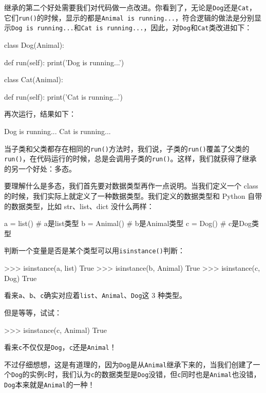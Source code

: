 继承的第二个好处需要我们对代码做一点改进。你看到了，无论是\texttt{Dog}还是\texttt{Cat}，它们\texttt{run()}的时候，显示的都是\texttt{Animal\ is\ running...}，符合逻辑的做法是分别显示\texttt{Dog\ is\ running...}和\texttt{Cat\ is\ running...}，因此，对\texttt{Dog}和\texttt{Cat}类改进如下：

\begin{pythoncode}
class Dog(Animal):

    def run(self):
        print('Dog is running...')

class Cat(Animal):

    def run(self):
        print('Cat is running...')
\end{pythoncode}

再次运行，结果如下：

\begin{pythoncode}
Dog is running...
Cat is running...
\end{pythoncode}

当子类和父类都存在相同的\texttt{run()}方法时，我们说，子类的\texttt{run()}覆盖了父类的\texttt{run()}，在代码运行的时候，总是会调用子类的\texttt{run()}。这样，我们就获得了继承的另一个好处：多态。

要理解什么是多态，我们首先要对数据类型再作一点说明。当我们定义一个 class
的时候，我们实际上就定义了一种数据类型。我们定义的数据类型和 Python
自带的数据类型，比如 str、list、dict 没什么两样：

\begin{pythoncode}
a = list() # a是list类型
b = Animal() # b是Animal类型
c = Dog() # c是Dog类型
\end{pythoncode}

判断一个变量是否是某个类型可以用\texttt{isinstance()}判断：

\begin{pythoncode}
>>> isinstance(a, list)
True
>>> isinstance(b, Animal)
True
>>> isinstance(c, Dog)
True
\end{pythoncode}

看来\texttt{a}、\texttt{b}、\texttt{c}确实对应着\texttt{list}、\texttt{Animal}、\texttt{Dog}这
3 种类型。

但是等等，试试：

\begin{pythoncode}
>>> isinstance(c, Animal)
True
\end{pythoncode}

看来\texttt{c}不仅仅是\texttt{Dog}，\texttt{c}还是\texttt{Animal}！

不过仔细想想，这是有道理的，因为\texttt{Dog}是从\texttt{Animal}继承下来的，当我们创建了一个\texttt{Dog}的实例\texttt{c}时，我们认为\texttt{c}的数据类型是\texttt{Dog}没错，但\texttt{c}同时也是\texttt{Animal}也没错，\texttt{Dog}本来就是\texttt{Animal}的一种！

